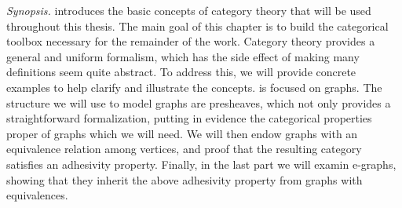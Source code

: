 \smallskip \emph{Synopsis.}  introduces the basic concepts of category theory that will be used throughout this thesis. The main goal of this chapter is to build the categorical toolbox necessary for the remainder of the work. Category theory provides a general and uniform formalism, which has the side effect of making many definitions seem quite abstract. To address this, we will provide concrete examples to help clarify and illustrate the concepts.
 is focused on graphs. The structure we will use to model graphs are presheaves, which not only provides a straightforward formalization, putting in evidence the categorical properties proper of graphs which we will need.  We will then endow graphs with an equivalence relation among vertices, and proof that the resulting category satisfies an adhesivity property. Finally, in the last part we will examin e-graphs, showing that they inherit the above adhesivity property from graphs with equivalences.


